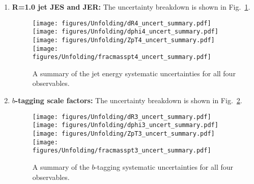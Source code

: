 \begin{enumerate}
  \item \textbf{R=1.0 jet JES and JER:} The uncertainty breakdown is shown in Fig.~\ref{fig:syst_overview_deltaR3}.
  
  \begin{figure}[htpb!]
\begin{center}
\texttt{[image: figures/Unfolding/dR4\_uncert\_summary.pdf]}\texttt{[image: figures/Unfolding/dphi4\_uncert\_summary.pdf]}\\
\texttt{[image: figures/Unfolding/ZpT4\_uncert\_summary.pdf]}\texttt{[image: figures/Unfolding/fracmasspt4\_uncert\_summary.pdf]}
\caption[]{A summary of the jet energy systematic uncertainties for all four observables. } 
\label{fig:syst_overview_deltaR3}
\end{center}
\end{figure}

  \item \textbf{$b$-tagging scale factors:} The uncertainty breakdown is shown in Fig.~\ref{fig:syst_overview_deltaR3b}.
  
  \begin{figure}[htpb!]
\begin{center}
\texttt{[image: figures/Unfolding/dR3\_uncert\_summary.pdf]}\texttt{[image: figures/Unfolding/dphi3\_uncert\_summary.pdf]}\\
\texttt{[image: figures/Unfolding/ZpT3\_uncert\_summary.pdf]}\texttt{[image: figures/Unfolding/fracmasspt3\_uncert\_summary.pdf]}
\caption[]{A summary of the $b$-tagging systematic uncertainties for all four observables. } 
\label{fig:syst_overview_deltaR3b}
\end{center}
\end{figure}
  

\end{enumerate}
